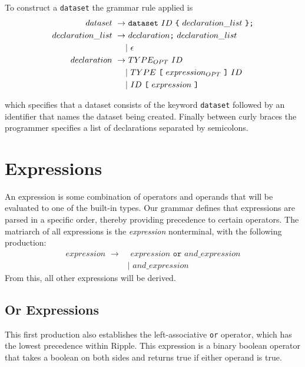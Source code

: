 \documentclass{article}
\newcommand{\code}{\texttt}
\begin{document}
To construct a \code{dataset} the grammar rule applied is
\begin{align*}
dataset\,\,\rightarrow&\,\,\code{dataset}\,\,ID\,\,\code{\{}\,\,declaration\_list\,\,\code{\}}\code{;} \\
declaration\_list\,\,\rightarrow&  \,\,declaration\code{;}\,\,declaration\_list                        \\
                                &| \,\,\epsilon                                                        \\
declaration\,\,\rightarrow&  \,\,TYPE_{OPT}\,\,ID                                                   \\
                          &| \,\,TYPE\,\,\code{\lbrack}\,\,expression_{OPT}\,\,\code{\rbrack}\,\,ID \\
                          &| \,\,ID\,\,\code{\lbrack}\,\,expression\,\,\code{\rbrack}
\end{align*}

which specifies that a dataset consists of the keyword \code{dataset} followed by an identifier that names the dataset being created. Finally between curly braces the programmer specifies a list of declarations separated by semicolons.

\section{Expressions}
An expression is some combination of operators and operands that will be evaluated to one of the built-in types. Our grammar defines that expressions are parsed in a specific order, thereby providing precedence to certain operators. The matriarch of all expressions is the \emph{expression} nonterminal, with the following production: 
\begin{align*}
expression\,\,\rightarrow&  \,\,expression\,\,\code{or}\,\,and\_expression \\
                         &| \,\,and\_expression                           
\end{align*}
From this, all other expressions will be derived.

\subsection{Or Expressions}
This first production also establishes the left-associative \code{or} operator, which has the lowest precedence within Ripple. This expression is a binary boolean operator that takes a boolean on both sides and returns true if either operand is true.
\end{document}
